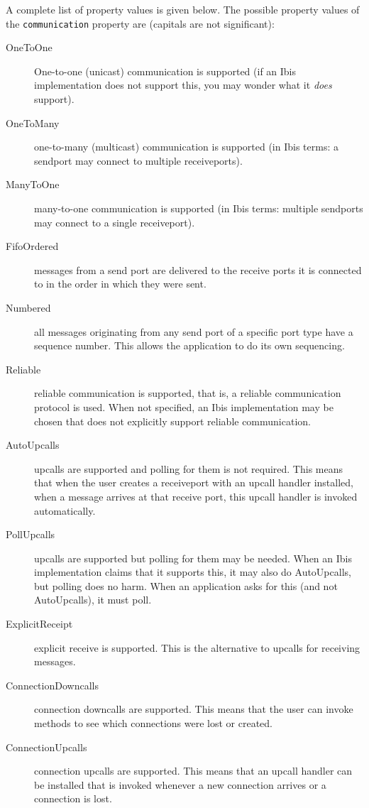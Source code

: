 \documentclass[10pt]{article}
\begin{document}
A complete list of property values is given below.
The possible property values of the \texttt{communication} property are
(capitals are not significant):
\begin{description}
\item[OneToOne]
One-to-one (unicast) communication is supported (if an Ibis implementation
does not support this, you may wonder what it \emph{does} support).
\item[OneToMany]
one-to-many (multicast) communication is supported
(in Ibis terms: a sendport
may connect to multiple receiveports).
\item[ManyToOne]
many-to-one communication is supported (in Ibis terms: multiple
sendports may connect to a single receiveport).
\item[FifoOrdered]
messages from a send port are delivered to the receive ports it is
connected to in the order in which they were sent.
\item[Numbered]
all messages originating from any send port of a specific port type have
a sequence number. This allows the application to do its own sequencing.
\item[Reliable]
reliable communication is supported, that is,
a reliable communication protocol is used.
When not specified, an Ibis implementation may be chosen that does not explicitly
support reliable communication.
\item[AutoUpcalls]
upcalls are supported and polling for them is not required.
This means that when the user creates a receiveport with an upcall
handler installed, when a message arrives at that receive port, 
this upcall handler is invoked automatically.
\item[PollUpcalls]
upcalls are supported but polling for them may be needed. When an
Ibis implementation claims that it supports this, it may also do
AutoUpcalls, but polling does no harm. When an application asks for
this (and not AutoUpcalls), it must poll.
\item[ExplicitReceipt]
explicit receive is supported.
This is the alternative to upcalls for receiving messages.
\item[ConnectionDowncalls]
connection downcalls are supported. This means that the user can
invoke methods to see which connections were lost or created.
\item[ConnectionUpcalls]
connection upcalls are supported. This means that an upcall
handler can be installed that is invoked whenever a new connection arrives
or a connection is lost.
\end{description}
\end{document}
